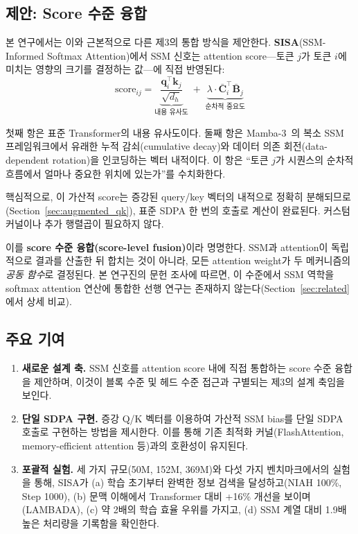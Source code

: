 \documentclass[11pt]{article}
\begin{document}
\subsection{제안: Score 수준 융합}

본 연구에서는 이와 근본적으로 다른 제3의 통합 방식을 제안한다. \textbf{SISA}(SSM-Informed Softmax Attention)에서 SSM 신호는 attention score---토큰 $j$가 토큰 $i$에 미치는 영향의 크기를 결정하는 값---에 직접 반영된다:
\begin{equation}
\text{score}_{ij} = \underbrace{\frac{\mathbf{q}_i^\top \mathbf{k}_j}{\sqrt{d_h}}}_{\text{내용 유사도}} \;+\; \underbrace{\lambda \cdot \bar{\mathbf{C}}_i^\top \bar{\mathbf{B}}_j}_{\text{순차적 중요도}}
\label{eq:sisa_main}
\end{equation}

첫째 항은 표준 Transformer의 내용 유사도이다. 둘째 항은 Mamba-3~\citep{mamba3}의 복소 SSM 프레임워크에서 유래한 누적 감쇠(cumulative decay)와 데이터 의존 회전(data-dependent rotation)을 인코딩하는 벡터 내적이다. 이 항은 ``토큰 $j$가 시퀀스의 순차적 흐름에서 얼마나 중요한 위치에 있는가''를 수치화한다.

핵심적으로, 이 가산적 score는 증강된 query/key 벡터의 내적으로 정확히 분해되므로(Section~\ref{sec:augmented_qk}), 표준 SDPA 한 번의 호출로 계산이 완료된다. 커스텀 커널이나 추가 행렬곱이 필요하지 않다.

이를 \textbf{score 수준 융합(score-level fusion)}이라 명명한다. SSM과 attention이 독립적으로 결과를 산출한 뒤 합치는 것이 아니라, 모든 attention weight가 두 메커니즘의 \emph{공동 함수}로 결정된다. 본 연구진의 문헌 조사에 따르면, 이 수준에서 SSM 역학을 softmax attention 연산에 통합한 선행 연구는 존재하지 않는다(Section~\ref{sec:related}에서 상세 비교).

\subsection{주요 기여}

\begin{enumerate}[leftmargin=*]
\item \textbf{새로운 설계 축.} SSM 신호를 attention score 내에 직접 통합하는 score 수준 융합을 제안하며, 이것이 블록 수준 및 헤드 수준 접근과 구별되는 제3의 설계 축임을 보인다.

\item \textbf{단일 SDPA 구현.} 증강 Q/K 벡터를 이용하여 가산적 SSM bias를 단일 SDPA 호출로 구현하는 방법을 제시한다. 이를 통해 기존 최적화 커널(FlashAttention, memory-efficient attention 등)과의 호환성이 유지된다.

\item \textbf{포괄적 실험.} 세 가지 규모(50M, 152M, 369M)와 다섯 가지 벤치마크에서의 실험을 통해, SISA가 (a) 학습 초기부터 완벽한 정보 검색을 달성하고(NIAH 100\%, Step 1000), (b) 문맥 이해에서 Transformer 대비 +16\% 개선을 보이며(LAMBADA), (c) 약 2배의 학습 효율 우위를 가지고, (d) SSM 계열 대비 1.9배 높은 처리량을 기록함을 확인한다.
\end{enumerate}
\end{document}
